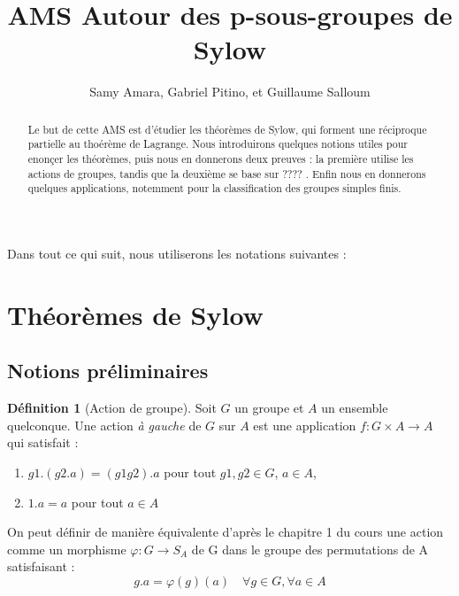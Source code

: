 \documentclass[french]{article}
\title{AMS Autour des p-sous-groupes de Sylow}
\author{Samy Amara, Gabriel Pitino, et Guillaume Salloum}
\date{}
\theoremstyle{definition}
\newtheorem{definition}[subsubsection]{Définition}
\theoremstyle{plain}
\theoremstyle{plain}
\theoremstyle{plain}
\theoremstyle{plain}
\theoremstyle{plain}
\begin{document}
\maketitle
\begin{abstract}
	Le but de cette AMS est d'étudier les théorèmes de Sylow, qui forment une réciproque partielle au thoérème de Lagrange.
	Nous introduirons quelques notions utiles pour enonçer les théorèmes, puis nous en donnerons deux preuves : la première utilise les actions de groupes, tandis que la deuxième se base sur ????  .
	Enfin nous en donnerons quelques applications, notemment pour la classification des groupes simples finis.%
\end{abstract}



\tableofcontents
\clearpage

Dans tout ce qui suit, nous utiliserons les notations suivantes :
\glsaddall
\printglossary[title=Notations,type=symbols,style=long,nonumberlist]

\clearpage


\section{Théorèmes de Sylow}
\subsection{Notions préliminaires}


\begin{definition}[Action de groupe]
	Soit \( G \) un groupe et \( A \) un ensemble quelconque. Une action \textit{à gauche} de \( G \) sur \( A \) est une application \( f : G \times A \rightarrow A\) qui satisfait :
	\begin{enumerate}[label = (\roman*)]
		\item \(g1.(g2.a) = (g1g2).a \) pour tout \(g1,g2 \in G\), \(a \in A\),
		\item \(1.a = a\) pour tout \(a \in A\)
	\end{enumerate}

	On peut définir de manière équivalente d'après le chapitre 1 du cours une action comme un morphisme \( \varphi : G \rightarrow S_{A} \) de G dans le groupe des permutations de A satisfaisant :
	\begin{equation}
		g.a = \varphi(g)(a) \quad \forall g \in G, \forall a \in A
	\end{equation}
\end{definition}
\end{document}
